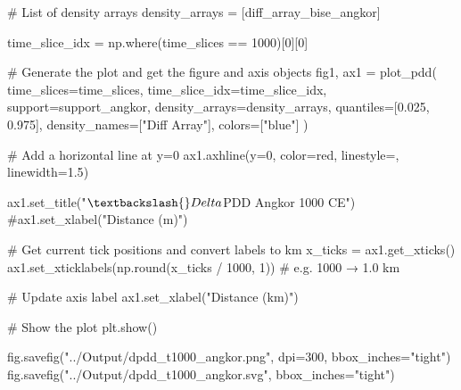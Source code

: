 \documentclass[
  11pt,
  letterpaper,
  DIV=11,
  numbers=noendperiod]{scrartcl}
\newenvironment{Shaded}{\begin{snugshade}}{\end{snugshade}}
\newcommand{\BuiltInTok}[1]{\textcolor[rgb]{0.00,0.23,0.31}{#1}}
\newcommand{\CommentTok}[1]{\textcolor[rgb]{0.37,0.37,0.37}{#1}}
\newcommand{\DecValTok}[1]{\textcolor[rgb]{0.68,0.00,0.00}{#1}}
\newcommand{\FloatTok}[1]{\textcolor[rgb]{0.68,0.00,0.00}{#1}}
\newcommand{\NormalTok}[1]{\textcolor[rgb]{0.00,0.23,0.31}{#1}}
\newcommand{\OperatorTok}[1]{\textcolor[rgb]{0.37,0.37,0.37}{#1}}
\newcommand{\StringTok}[1]{\textcolor[rgb]{0.13,0.47,0.30}{#1}}
\begin{document}
\begin{Shaded}
\begin{Highlighting}[]
\CommentTok{\# List of density arrays}
\NormalTok{density\_arrays }\OperatorTok{=}\NormalTok{ [diff\_array\_bise\_angkor]}

\NormalTok{time\_slice\_idx }\OperatorTok{=}\NormalTok{ np.where(time\_slices }\OperatorTok{==} \DecValTok{1000}\NormalTok{)[}\DecValTok{0}\NormalTok{][}\DecValTok{0}\NormalTok{]}

\CommentTok{\# Generate the plot and get the figure and axis objects}
\NormalTok{fig1, ax1 }\OperatorTok{=}\NormalTok{ plot\_pdd(}
\NormalTok{    time\_slices}\OperatorTok{=}\NormalTok{time\_slices,}
\NormalTok{    time\_slice\_idx}\OperatorTok{=}\NormalTok{time\_slice\_idx,}
\NormalTok{    support}\OperatorTok{=}\NormalTok{support\_angkor,}
\NormalTok{    density\_arrays}\OperatorTok{=}\NormalTok{density\_arrays,}
\NormalTok{    quantiles}\OperatorTok{=}\NormalTok{[}\FloatTok{0.025}\NormalTok{, }\FloatTok{0.975}\NormalTok{],}
\NormalTok{    density\_names}\OperatorTok{=}\NormalTok{[}\StringTok{"Diff Array"}\NormalTok{],}
\NormalTok{    colors}\OperatorTok{=}\NormalTok{[}\StringTok{"blue"}\NormalTok{]}
\NormalTok{)}

\CommentTok{\# Add a horizontal line at y=0}
\NormalTok{ax1.axhline(y}\OperatorTok{=}\DecValTok{0}\NormalTok{, color}\OperatorTok{=}\StringTok{\textquotesingle{}red\textquotesingle{}}\NormalTok{, linestyle}\OperatorTok{=}\StringTok{\textquotesingle{}{-}{-}\textquotesingle{}}\NormalTok{, linewidth}\OperatorTok{=}\FloatTok{1.5}\NormalTok{)}

\NormalTok{ax1.set\_title(}\StringTok{"$\textbackslash{}Delta$PDD Angkor 1000 CE"}\NormalTok{)}
\CommentTok{\#ax1.set\_xlabel("Distance (m)")}

\CommentTok{\# Get current tick positions and convert labels to km}
\NormalTok{x\_ticks }\OperatorTok{=}\NormalTok{ ax1.get\_xticks()}
\NormalTok{ax1.set\_xticklabels(np.}\BuiltInTok{round}\NormalTok{(x\_ticks }\OperatorTok{/} \DecValTok{1000}\NormalTok{, }\DecValTok{1}\NormalTok{))  }\CommentTok{\# e.g. 1000 → 1.0 km}

\CommentTok{\# Update axis label}
\NormalTok{ax1.set\_xlabel(}\StringTok{"Distance (km)"}\NormalTok{)}

\CommentTok{\# Show the plot}
\NormalTok{plt.show()}

\NormalTok{fig.savefig(}\StringTok{"../Output/dpdd\_t1000\_angkor.png"}\NormalTok{, dpi}\OperatorTok{=}\DecValTok{300}\NormalTok{, bbox\_inches}\OperatorTok{=}\StringTok{"tight"}\NormalTok{)}
\NormalTok{fig.savefig(}\StringTok{"../Output/dpdd\_t1000\_angkor.svg"}\NormalTok{, bbox\_inches}\OperatorTok{=}\StringTok{"tight"}\NormalTok{)}
\end{Highlighting}
\end{Shaded}
\end{document}
